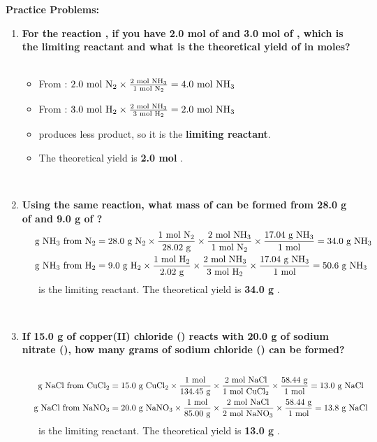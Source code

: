 \documentclass{article}
\begin{document}
\textbf{Practice Problems:}
\begin{enumerate}[itemsep=5pt]
    \item \textbf{For the reaction , if you have 2.0 mol of  and 3.0 mol of , which is the limiting reactant and what is the theoretical yield of  in moles?}
    \begin{itemize}
        \item From : $2.0 \text{ mol } \ce{N2} \times \frac{2 \text{ mol } \ce{NH3}}{1 \text{ mol } \ce{N2}} = 4.0 \text{ mol } \ce{NH3}$
        \item From : $3.0 \text{ mol } \ce{H2} \times \frac{2 \text{ mol } \ce{NH3}}{3 \text{ mol } \ce{H2}} = 2.0 \text{ mol } \ce{NH3}$
        \item {} produces less product, so it is the \textbf{limiting reactant}.
        \item The theoretical yield is \textbf{2.0 mol }.
    \end{itemize}
    \item \textbf{Using the same reaction, what mass of  can be formed from 28.0 g of  and 9.0 g of ?}
    \begin{align*}
        \text{g } \ce{NH3} \text{ from } \ce{N2} &= 28.0 \text{ g } \ce{N2} \times \frac{1 \text{ mol } \ce{N2}}{28.02 \text{ g}} \times \frac{2 \text{ mol } \ce{NH3}}{1 \text{ mol } \ce{N2}} \times \frac{17.04 \text{ g } \ce{NH3}}{1 \text{ mol}} = 34.0 \text{ g } \ce{NH3} \\
        \text{g } \ce{NH3} \text{ from } \ce{H2} &= 9.0 \text{ g } \ce{H2} \times \frac{1 \text{ mol } \ce{H2}}{2.02 \text{ g}} \times \frac{2 \text{ mol } \ce{NH3}}{3 \text{ mol } \ce{H2}} \times \frac{17.04 \text{ g } \ce{NH3}}{1 \text{ mol}} = 50.6 \text{ g } \ce{NH3}
    \end{align*}
     is the limiting reactant. The theoretical yield is \textbf{34.0 g }.

    \item \textbf{If 15.0 g of copper(II) chloride () reacts with 20.0 g of sodium nitrate (), how many grams of sodium chloride () can be formed? }
    \begin{align*}
        \text{g } \ce{NaCl} \text{ from } \ce{CuCl2} &= 15.0 \text{ g } \ce{CuCl2} \times \frac{1 \text{ mol}}{134.45 \text{ g}} \times \frac{2 \text{ mol } \ce{NaCl}}{1 \text{ mol } \ce{CuCl2}} \times \frac{58.44 \text{ g}}{1 \text{ mol}} = 13.0 \text{ g } \ce{NaCl} \\
        \text{g } \ce{NaCl} \text{ from } \ce{NaNO3} &= 20.0 \text{ g } \ce{NaNO3} \times \frac{1 \text{ mol}}{85.00 \text{ g}} \times \frac{2 \text{ mol } \ce{NaCl}}{2 \text{ mol } \ce{NaNO3}} \times \frac{58.44 \text{ g}}{1 \text{ mol}} = 13.8 \text{ g } \ce{NaCl}
    \end{align*}
     is the limiting reactant. The theoretical yield is \textbf{13.0 g }.


\end{enumerate}
\end{document}
